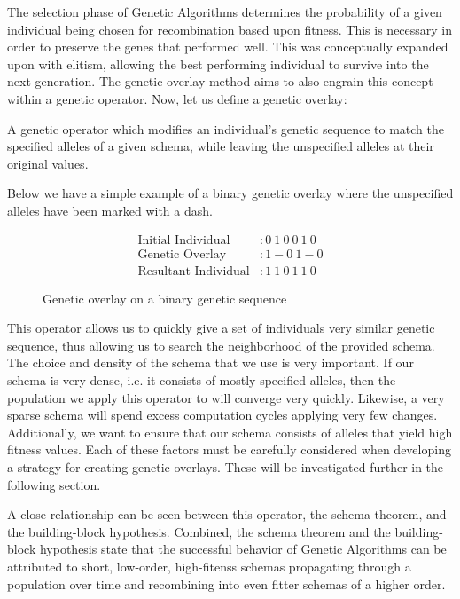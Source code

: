 The selection phase of Genetic Algorithms determines the probability of a given individual being chosen for recombination based upon fitness. This is necessary in order to preserve the genes that performed well. This was conceptually expanded upon with elitism, allowing the best performing individual to survive into the next generation. The genetic overlay method aims to also engrain this concept within a genetic operator. Now, let us define a genetic overlay:

\begin{overlay}
A genetic operator which modifies an individual's genetic sequence to match the specified alleles of a given schema, while leaving the unspecified alleles at their original values. 
\end{overlay}

Below we have a simple example of a binary genetic overlay where the unspecified alleles have been marked with a dash. 

\begin{figure}[h!]
\centering 
\begin{align*}
\text{Initial Individual} &: 0~1~0~0~1~0 		\\
\text{Genetic Overlay} &: 1-0~1-0		\\
\text{Resultant Individual} &: 1~1~0~1~1~0			
\end{align*}

\caption{Genetic overlay on a binary genetic sequence}

\end{figure}

This operator allows us to quickly give a set of individuals very similar genetic sequence, thus allowing us to search the neighborhood of the provided schema. The choice and density of the schema that we use is very important. If our schema is very dense, i.e. it consists of mostly specified alleles, then the population we apply this operator to will converge very quickly. Likewise, a very sparse schema will spend excess computation cycles applying very few changes. Additionally, we want to ensure that our schema consists of alleles that yield high fitness values. Each of these factors must be carefully considered when developing a strategy for creating genetic overlays. These will be investigated further in the following section.

A close relationship can be seen between this operator, the schema theorem, and the building-block hypothesis\cite{Goldberg89, Holland75}. Combined, the schema theorem and the building-block hypothesis state that the successful behavior of Genetic Algorithms can be attributed to short, low-order, high-fitenss schemas propagating through a population over time and recombining into even fitter schemas of a higher order\cite{Forrest93, Goldberg89, Holland75, Russell10}. 

